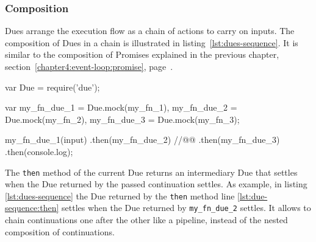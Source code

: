 

\subsubsection{Composition}

Dues arrange the execution flow as a chain of actions to carry on inputs.
The composition of Dues in a chain is illustrated in listing~\ref{lst:dues-sequence}.
It is similar to the composition of Promises explained in the previous chapter, section~\ref{chapter4:event-loop:promise}, page~\pageref{chapter4:event-loop:promise}.

\begin{code}[js, %
             caption={Dues are chained like Promises}, %
             label={lst:dues-sequence}] %
var Due = require('due');

var my_fn_due_1 = Due.mock(my_fn_1),
    my_fn_due_2 = Due.mock(my_fn_2),
    my_fn_due_3 = Due.mock(my_fn_3);

my_fn_due_1(input)
.then(my_fn_due_2) //@\label{lst:due-sequence:then}@
.then(my_fn_due_3)
.then(console.log);
\end{code}

The \texttt{then} method of the current Due returns an intermediary Due that settles when the Due returned by the passed continuation settles.
As example, in listing \ref{lst:dues-sequence} the Due returned by the \texttt{then} method line \ref{lst:due-sequence:then} settles when the Due returned by \texttt{my\_fn\_due\_2} settles.
It allows to chain continuations one after the other like a pipeline, instead of the nested composition of continuations.







